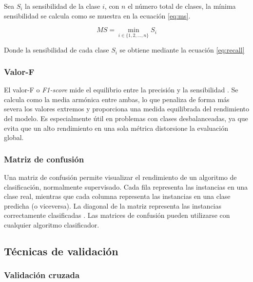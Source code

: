 \vspace{1em}

Sea \( S_i \) la sensibilidad de la clase \( i \), con \( n \) el número total de clases, la mínima sensibilidad se calcula como se muestra en la ecuación \ref{eq:ms}.

\begin{equation}
	MS = \min_{i \in \{1, 2, \dots, n\}} S_i
	\label{eq:ms}
\end{equation}

Donde la sensibilidad de cada clase \( S_i \) se obtiene mediante la ecuación \ref{eq:recall}

\newpage
\subsubsection{Valor-F}
\label{subsubsec:f1}

El valor-F o \textit{F1-score} mide el equilibrio entre la precisión y la sensibilidad \cite{metrics}. Se calcula como la media armónica entre ambas, lo que penaliza de forma más severa los valores extremos y proporciona una medida equilibrada del rendimiento del modelo. Es especialmente útil en problemas con clases desbalanceadas, ya que evita que un alto rendimiento en una sola métrica distorsione la evaluación global.

\subsubsection{Matriz de confusión}
\label{subsubsec:matrix}

Una matriz de confusión permite visualizar el rendimiento de un algoritmo de clasificación, normalmente supervisado. Cada fila representa las instancias en una clase real, mientras que cada columna representa las instancias en una clase predicha (o viceversa). La diagonal de la matriz representa las instancias correctamente clasificadas \cite{confmat}. Las matrices de confusión pueden utilizarse con cualquier algoritmo clasificador.

\subsection{Técnicas de validación}
\label{subsec:validacion}



\subsubsection{Validación cruzada}
\label{subsubsec:cv}



